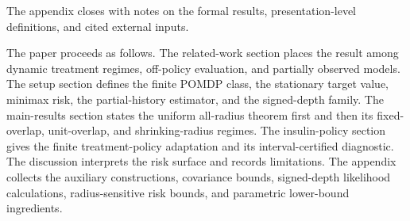 The appendix closes with notes on the formal results, presentation-level definitions, and cited external inputs.

The paper proceeds as follows. The related-work section places the result among dynamic treatment regimes, off-policy evaluation, and partially observed models. The setup section defines the finite POMDP class, the stationary target value, minimax risk, the partial-history estimator, and the signed-depth family. The main-results section states the uniform all-radius theorem first and then its fixed-overlap, unit-overlap, and shrinking-radius regimes. The insulin-policy section gives the finite treatment-policy adaptation and its interval-certified diagnostic. The discussion interprets the risk surface and records limitations. The appendix collects the auxiliary constructions, covariance bounds, signed-depth likelihood calculations, radius-sensitive risk bounds, and parametric lower-bound ingredients.
